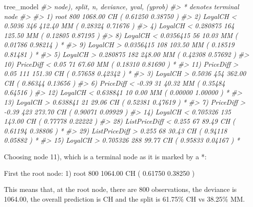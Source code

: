 \documentclass[
]{book}
\newenvironment{Shaded}{\begin{snugshade}}{\end{snugshade}}
\newcommand{\CommentTok}[1]{\textcolor[rgb]{0.56,0.35,0.01}{\textit{#1}}}
\newcommand{\NormalTok}[1]{#1}
\begin{document}
\begin{Shaded}
\begin{Highlighting}[]
\NormalTok{tree\_model}
\CommentTok{\#\textgreater{} node), split, n, deviance, yval, (yprob)}
\CommentTok{\#\textgreater{}       * denotes terminal node}
\CommentTok{\#\textgreater{} }
\CommentTok{\#\textgreater{}  1) root 800 1068.00 CH ( 0.61250 0.38750 )  }
\CommentTok{\#\textgreater{}    2) LoyalCH \textless{} 0.5036 346  412.40 MM ( 0.28324 0.71676 )  }
\CommentTok{\#\textgreater{}      4) LoyalCH \textless{} 0.280875 164  125.50 MM ( 0.12805 0.87195 )  }
\CommentTok{\#\textgreater{}        8) LoyalCH \textless{} 0.0356415 56   10.03 MM ( 0.01786 0.98214 ) *}
\CommentTok{\#\textgreater{}        9) LoyalCH \textgreater{} 0.0356415 108  103.50 MM ( 0.18519 0.81481 ) *}
\CommentTok{\#\textgreater{}      5) LoyalCH \textgreater{} 0.280875 182  248.00 MM ( 0.42308 0.57692 )  }
\CommentTok{\#\textgreater{}       10) PriceDiff \textless{} 0.05 71   67.60 MM ( 0.18310 0.81690 ) *}
\CommentTok{\#\textgreater{}       11) PriceDiff \textgreater{} 0.05 111  151.30 CH ( 0.57658 0.42342 ) *}
\CommentTok{\#\textgreater{}    3) LoyalCH \textgreater{} 0.5036 454  362.00 CH ( 0.86344 0.13656 )  }
\CommentTok{\#\textgreater{}      6) PriceDiff \textless{} {-}0.39 31   40.32 MM ( 0.35484 0.64516 )  }
\CommentTok{\#\textgreater{}       12) LoyalCH \textless{} 0.638841 10    0.00 MM ( 0.00000 1.00000 ) *}
\CommentTok{\#\textgreater{}       13) LoyalCH \textgreater{} 0.638841 21   29.06 CH ( 0.52381 0.47619 ) *}
\CommentTok{\#\textgreater{}      7) PriceDiff \textgreater{} {-}0.39 423  273.70 CH ( 0.90071 0.09929 )  }
\CommentTok{\#\textgreater{}       14) LoyalCH \textless{} 0.705326 135  143.00 CH ( 0.77778 0.22222 )  }
\CommentTok{\#\textgreater{}         28) ListPriceDiff \textless{} 0.255 67   89.49 CH ( 0.61194 0.38806 ) *}
\CommentTok{\#\textgreater{}         29) ListPriceDiff \textgreater{} 0.255 68   30.43 CH ( 0.94118 0.05882 ) *}
\CommentTok{\#\textgreater{}       15) LoyalCH \textgreater{} 0.705326 288   99.77 CH ( 0.95833 0.04167 ) *}
\end{Highlighting}
\end{Shaded}

Choosing node 11), which is a terminal node as it is marked by a *:

First the root node: 1) root 800 1064.00 CH ( 0.61750 0.38250 )

This means that, at the root node, there are 800 observations, the deviance is 1064.00, the overall prediction is CH and the split is 61.75\% CH vs 38.25\% MM.
\end{document}
